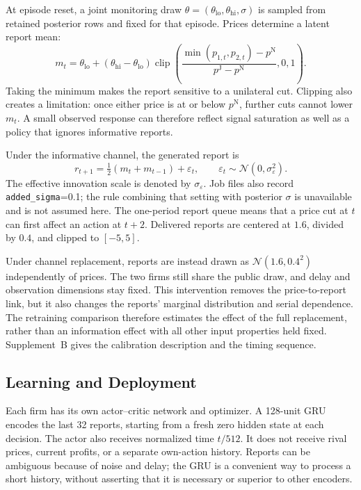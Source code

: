 \documentclass{article}
\begin{document}
At episode reset, a joint monitoring draw $\theta=(\theta_{\mathrm{lo}},\theta_{\mathrm{hi}},\sigma)$ is sampled from retained posterior rows and fixed for that episode. Prices determine a latent report mean:
\begin{equation}
m_t=\theta_{\mathrm{lo}}+(\theta_{\mathrm{hi}}-\theta_{\mathrm{lo}})
\operatorname{clip}\!\left(\frac{\min(p_{1,t},p_{2,t})-p^{\mathrm N}}{p^{\mathrm J}-p^{\mathrm N}},0,1\right).
\label{eq:latent}
\end{equation}
Taking the minimum makes the report sensitive to a unilateral cut. Clipping also creates a limitation: once either price is at or below $p^{\mathrm N}$, further cuts cannot lower $m_t$. A small observed response can therefore reflect signal saturation as well as a policy that ignores informative reports.

Under the informative channel, the generated report is
\begin{equation}
r_{t+1}=\tfrac12(m_t+m_{t-1})+\varepsilon_t,
\qquad\varepsilon_t\sim\mathcal N(0,\sigma_\varepsilon^2).
\label{eq:report}
\end{equation}
The effective innovation scale is denoted by $\sigma_\varepsilon$. Job files also record \texttt{added\_sigma}=0.1; the rule combining that setting with posterior $\sigma$ is unavailable and is not assumed here. The one-period report queue means that a price cut at $t$ can first affect an action at $t+2$. Delivered reports are centered at $1.6$, divided by $0.4$, and clipped to $[-5,5]$.

Under channel replacement, reports are instead drawn as $\mathcal N(1.6,0.4^2)$ independently of prices. The two firms still share the public draw, and delay and observation dimensions stay fixed. This intervention removes the price-to-report link, but it also changes the reports' marginal distribution and serial dependence. The retraining comparison therefore estimates the effect of the full replacement, rather than an information effect with all other input properties held fixed. Supplement~B gives the calibration description and the timing sequence.

\subsection{Learning and Deployment}

Each firm has its own actor--critic network and optimizer. A 128-unit GRU encodes the last 32 reports, starting from a fresh zero hidden state at each decision. The actor also receives normalized time $t/512$. It does not receive rival prices, current profits, or a separate own-action history. Reports can be ambiguous because of noise and delay; the GRU is a convenient way to process a short history, without asserting that it is necessary or superior to other encoders.
\end{document}
